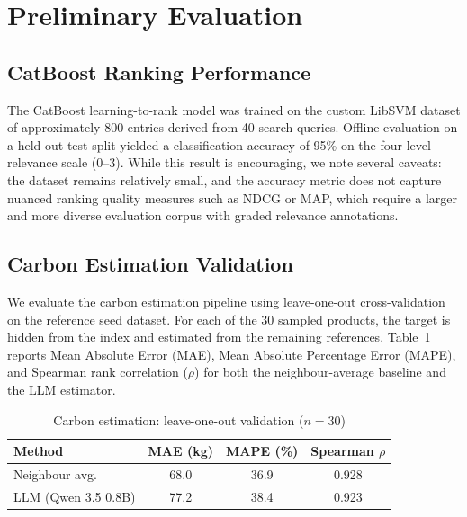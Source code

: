 \documentclass[conference]{IEEEtran}
\begin{document}
\section{Preliminary Evaluation}

\subsection{CatBoost Ranking Performance}

The CatBoost learning-to-rank model was trained on the custom LibSVM dataset of approximately 800 entries derived from 40 search queries. Offline evaluation on a held-out test split yielded a classification accuracy of 95\% on the four-level relevance scale (0--3). While this result is encouraging, we note several caveats: the dataset remains relatively small, and the accuracy metric does not capture nuanced ranking quality measures such as NDCG or MAP, which require a larger and more diverse evaluation corpus with graded relevance annotations.

\subsection{Carbon Estimation Validation}

We evaluate the carbon estimation pipeline using leave-one-out cross-validation on the reference seed dataset. For each of the 30 sampled products, the target is hidden from the index and estimated from the remaining references. Table~\ref{tab:carbon} reports Mean Absolute Error (MAE), Mean Absolute Percentage Error (MAPE), and Spearman rank correlation ($\rho$) for both the neighbour-average baseline and the LLM estimator.

\begin{table}[htbp]
\caption{Carbon estimation: leave-one-out validation ($n=30$)}
\label{tab:carbon}
\centering
\begin{tabular}{lccc}
\toprule
\textbf{Method} & \textbf{MAE (kg)} & \textbf{MAPE (\%)} & \textbf{Spearman} $\rho$ \\
\midrule
Neighbour avg.  & 68.0  & 36.9  & 0.928 \\
LLM (Qwen 3.5 0.8B) & 77.2 & 38.4 & 0.923 \\
\bottomrule
\end{tabular}
\end{table}
\end{document}

